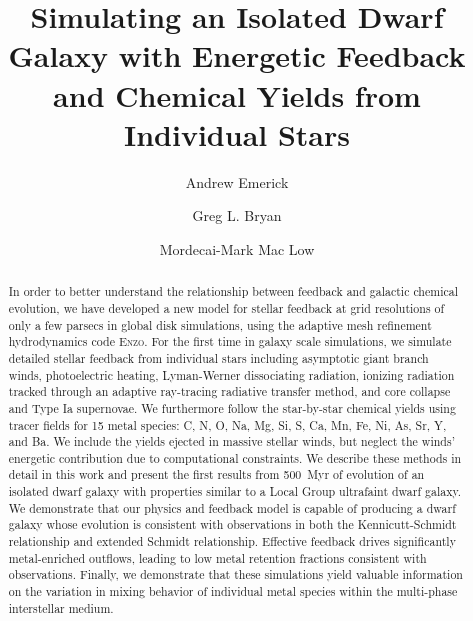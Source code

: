\documentclass[twocolumn]{aastex61}
\begin{document}
\title{Simulating an Isolated Dwarf Galaxy with Energetic Feedback and Chemical Yields from Individual Stars}

\author{Andrew Emerick}
\author{Greg L. Bryan}
\author{Mordecai-Mark Mac Low}


\begin{abstract}
In order to better understand the relationship between feedback and galactic chemical evolution, we have developed a new model for stellar feedback at grid resolutions of only a few parsecs in global disk simulations, using the adaptive mesh refinement hydrodynamics code \textsc{Enzo}. For the first time in galaxy scale simulations, we simulate detailed stellar feedback from individual stars including asymptotic giant branch winds, photoelectric heating, Lyman-Werner dissociating radiation, ionizing radiation tracked through an adaptive ray-tracing radiative transfer method, and core collapse and Type Ia supernovae. We furthermore follow the star-by-star chemical yields using tracer fields for 15 metal species: C, N, O, Na, Mg, Si, S, Ca, Mn, Fe, Ni, As, Sr, Y, and Ba. We include the yields ejected in massive stellar winds, but neglect the winds' energetic contribution due to computational constraints. We describe these methods in detail in this work and present the first results from 500~Myr of evolution of an isolated dwarf galaxy with properties similar to a Local Group ultrafaint dwarf galaxy. We demonstrate that our physics and feedback model is capable of producing a dwarf galaxy whose evolution is consistent with observations in both the Kennicutt-Schmidt relationship and extended Schmidt relationship. Effective feedback drives significantly metal-enriched outflows, leading to low metal retention fractions consistent with observations. Finally, we demonstrate that these simulations yield valuable information on the variation in mixing behavior of individual metal species within the multi-phase interstellar medium.
\end{abstract}
\end{document}
